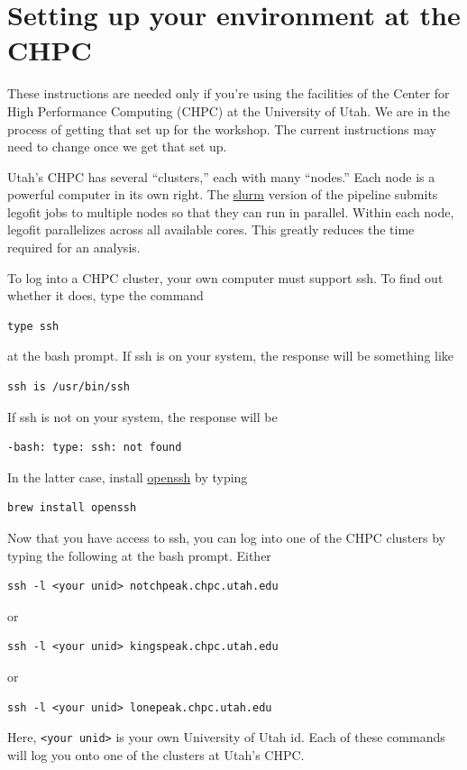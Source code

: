 \documentclass[11pt]{article}
\begin{document}
\section{Setting up your environment at the CHPC}
\label{sec.chpc}
These instructions are needed only if you're using the facilities of
the Center for High Performance Computing (CHPC) at the University of
Utah. We are in the process of getting that set up for the
workshop. The current instructions may need to change once we get that
set up.

Utah's CHPC has several ``clusters,'' each with many ``nodes.''  Each
node is a powerful computer in its own right. The
\href{https://slurm.schedmd.com/documentation.html}{slurm} version of
the pipeline submits legofit jobs to multiple nodes so that they can
run in parallel. Within each node, legofit parallelizes across all
available cores. This greatly reduces the time required for an
analysis.

To log into a CHPC cluster, your own computer must support ssh. To
find out whether it does, type the command
\begin{verbatim}
type ssh
\end{verbatim}
at the bash prompt. If ssh is on your system, the response will be
something like
\begin{verbatim}
ssh is /usr/bin/ssh
\end{verbatim}
If ssh is not on your system, the response will be
\begin{verbatim}
-bash: type: ssh: not found
\end{verbatim}
In the latter case, install \href{https://www.openssh.com}{openssh} by
typing
\begin{verbatim}
brew install openssh
\end{verbatim}

Now that you have access to ssh, you can log into one of the CHPC
clusters by typing the following at the bash prompt. Either
\begin{verbatim}
ssh -l <your unid> notchpeak.chpc.utah.edu
\end{verbatim}
or
\begin{verbatim}
ssh -l <your unid> kingspeak.chpc.utah.edu
\end{verbatim}
or
\begin{verbatim}
ssh -l <your unid> lonepeak.chpc.utah.edu
\end{verbatim}
Here, \verb|<your unid>| is your own University of Utah id. Each of
these commands will log you onto one of the clusters at Utah's CHPC.
\end{document}
